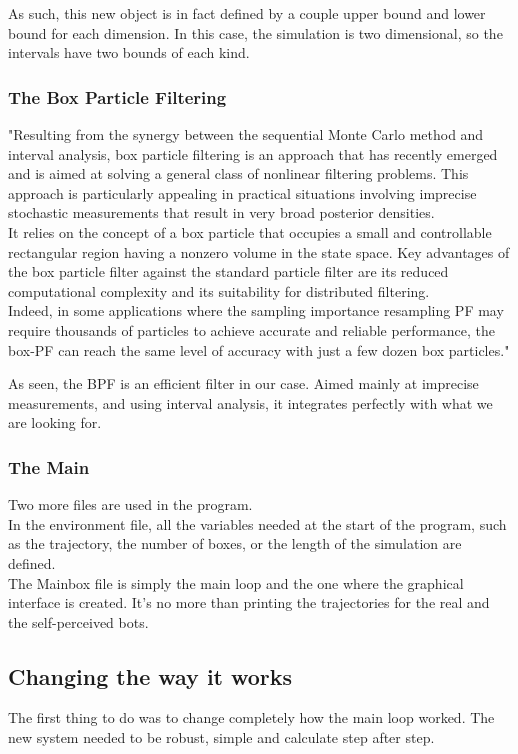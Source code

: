 As such, this new object is in fact defined by a couple upper bound and lower bound for each dimension.
In this case, the simulation is two dimensional, so the intervals have two bounds of each kind.
\subsubsection{The Box Particle Filtering}
"Resulting from the synergy between the sequential Monte Carlo method and interval analysis, box particle filtering is an approach that has recently emerged and is aimed at solving a general class of nonlinear filtering problems.
This approach is particularly appealing in practical situations involving imprecise stochastic measurements that result in very broad posterior densities.\\

It relies on the concept of a box particle that occupies a small and controllable rectangular region having a nonzero volume in the state space.
Key advantages of the box particle filter against the standard particle filter are its reduced computational complexity and its suitability for distributed filtering.\\

Indeed, in some applications where the sampling importance resampling PF may require thousands of particles to achieve accurate and reliable performance, the box-PF can reach the same level of accuracy with just a few dozen box particles."\parencite{BPF}

As seen, the BPF is an efficient filter in our case. Aimed mainly at imprecise measurements, and using interval analysis, it integrates perfectly with what we are looking for.

\subsubsection{The Main}
Two more files are used in the program.\\

In the environment file, all the variables needed at the start of the program,
 such as the trajectory, the number of boxes, or the length of the simulation are defined.\\

The Mainbox file is simply the main loop and the one where the graphical interface is created. It's no more than printing the trajectories for the real and the self-perceived bots.

\subsection{Changing the way it works}
The first thing to do was to change completely how the main loop worked.
The new system needed to be robust, simple and calculate step after step.\\

